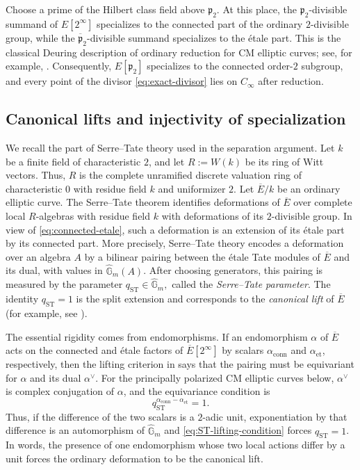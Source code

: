 \documentclass[11pt]{amsart}
\theoremstyle{remark}
\numberwithin{equation}{section}
\begin{document}
Choose a prime of the Hilbert class field above $\mathfrak p_2$.  At this
place, the $\mathfrak p_2$-divisible summand of $E[2^\infty]$ specializes to
the connected part of the ordinary $2$-divisible group, while the
$\overline{\mathfrak p}_2$-divisible summand specializes to the \'etale part.
This is the classical Deuring description of ordinary reduction for CM
elliptic curves; see, for example, \cite[Section~14]{Cox,GrossX0N}.
Consequently, $E[\mathfrak p_2]$ specializes to the connected order-$2$
subgroup, and every point of the divisor \eqref{eq:exact-divisor} lies on
$C_\infty$ after reduction.

\subsection{Canonical lifts and injectivity of specialization}

We recall the part of Serre--Tate theory used in the separation argument. 
Let $k$ be a finite field of characteristic $2$, and let
$R:=W(k)$ be its ring of Witt vectors.  Thus, $R$ is the complete
unramified discrete valuation ring of characteristic $0$ with residue field
$k$ and uniformizer $2$.  Let $\overline E/k$ be an ordinary elliptic curve.
The Serre--Tate theorem identifies
deformations of $\overline E$ over complete local $R$-algebras with residue
field $k$ with
deformations of its $2$-divisible group.  In view of
\eqref{eq:connected-etale}, such a deformation is an extension of its
\'etale part by its connected part.  More precisely, Serre--Tate theory
encodes a deformation over an algebra $A$ by a bilinear pairing between the
\'etale Tate modules of $\overline E$ and its dual, with values in
$\widehat{\mathbb G}_m(A)$.  After choosing generators, this pairing is
measured by the parameter
$q_{\mathrm{ST}}\in\widehat{\mathbb G}_m,$
called the \emph{Serre--Tate parameter}.  The identity
$q_{\mathrm{ST}}=1$ is the split extension and corresponds to the
\emph{canonical lift} of $\overline E$ (for example, see \cite[Theorems~1.2.1 and~2.1]{KatzST}).

The essential rigidity comes from endomorphisms.  If an endomorphism
$\alpha$ of $\overline E$ acts on the connected and \'etale factors of
$\overline E[2^\infty]$ by scalars
$\alpha_{\mathrm{conn}}$ and $\alpha_{\mathrm{et}}$, respectively, then
the lifting criterion in \cite[Theorem~2.1(4)]{KatzST} says that the pairing
must be equivariant for $\alpha$ and its dual $\alpha^\vee$.  For the
principally polarized CM elliptic curves below, $\alpha^\vee$ is complex
conjugation of $\alpha$, and the equivariance condition is
\begin{equation}\label{eq:ST-lifting-condition}
 q_{\mathrm{ST}}^{\alpha_{\mathrm{conn}}-
                         \alpha_{\mathrm{et}}}=1.
\end{equation}
Thus, if the difference of the two scalars is a $2$-adic unit, exponentiation
by that difference is an automorphism of $\widehat{\mathbb G}_m$ and
\eqref{eq:ST-lifting-condition} forces $q_{\mathrm{ST}}=1$.  In words, the
presence of one endomorphism whose two local actions differ by a unit forces
the ordinary deformation to be the canonical lift.
\end{document}
